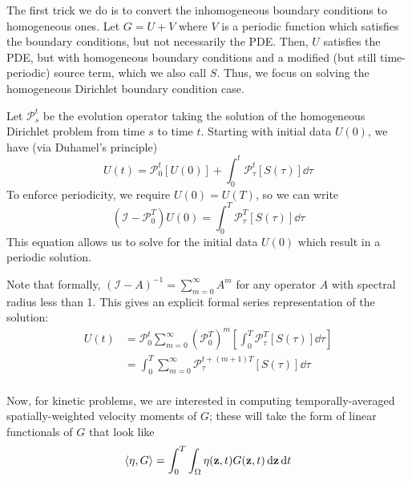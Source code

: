 \documentclass[]{article}
\begin{document}
The first trick we do is to convert the inhomogeneous boundary conditions to homogeneous ones.
Let \(G = U + V\) where \(V\) is a periodic function which satisfies the boundary conditions, but not necessarily the PDE.
Then, \(U\) satisfies the PDE, but with homogeneous boundary conditions and a modified (but still time-periodic) source term, which we also call \(S\).
Thus, we focus on solving the homogeneous Dirichlet boundary condition case.

Let \(\mathcal{P}_{s}^{t}\) be the evolution operator taking the solution of the homogeneous Dirichlet problem from time \(s\) to time \(t\).
Starting with initial data \(U(0)\), we have (via Duhamel's principle)
\begin{equation*}
	U(t) = \mathcal{P}_{0}^{t}[U(0)] + \int_{0}^{t} \mathcal{P}_{\tau}^{t}[S(\tau)] \dd{\tau}
\end{equation*}
To enforce periodicity, we require \(U(0) = U(T)\), so we can write
\begin{equation}
	(\mathcal{I} - \mathcal{P}_{0}^{T}) U(0) = \int_{0}^{T} \mathcal{P}_{\tau}^{T}[S(\tau)] \dd{\tau}
\end{equation}
This equation allows us to solve for the initial data \(U(0)\) which result in a periodic solution.

Note that formally, \((\mathcal{I} - A)^{-1} = \sum_{m=0}^{\infty} A^m\) for any operator \(A\) with spectral radius less than 1.
This gives an explicit formal series representation of the solution:
\begin{align*}
	U(t) &= \mathcal{P}_{0}^{t} \sum_{m=0}^{\infty} (\mathcal{P}_{0}^{T})^m \left[\int_{0}^{T} \mathcal{P}_{\tau}^{T}[S(\tau)] \dd{\tau}\right] \\
	&= \int_{0}^{T} \sum_{m=0}^{\infty} \mathcal{P}_{\tau}^{t + (m+1)T} [S(\tau)] \dd{\tau} \\
\end{align*} 

Now, for kinetic problems, we are interested in computing temporally-averaged spatially-weighted velocity moments of \(G\); these will take the form of linear functionals of \(G\) that look like
\begin{equation*}
	\langle \eta, G \rangle = \int_{0}^{T} \int_{\Omega} \eta(\vb{z},t) G(\vb{z},t) \dd{\vb{z}} \dd{t}
\end{equation*}
\end{document}
